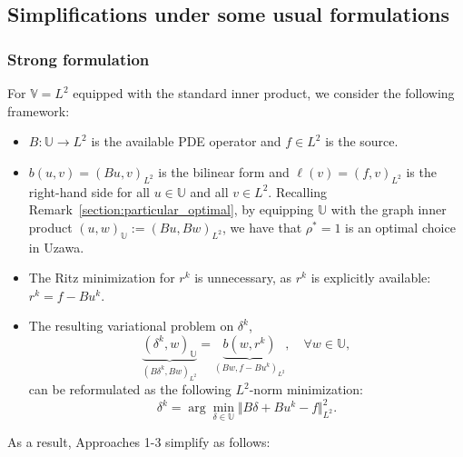 \documentclass{article}
\theoremstyle{definition}
\begin{document}
\subsection{Simplifications under some usual formulations}\label{section:Simplifications}

\subsubsection{Strong formulation}\label{section:PINNs}
For $\mathbb{V}=L^2$ equipped with the standard inner product, we consider the following framework:
\begin{itemize}
    \item $B:\mathbb{U}\longrightarrow L^2$ is the available PDE operator and $f\in L^2$ is the source.
    \item $b(u,v)=(Bu,v)_{L^2}$ is the bilinear form and $\ell(v)=(f,v)_{L^2}$ is the right-hand side for all $u\in\mathbb{U}$ and all $v\in L^2$. Recalling Remark~\ref{section:particular_optimal}, by equipping $\mathbb{U}$ with the graph inner product $(u,w)_\mathbb{U} := (Bu,Bw)_{L^2}$, we have that $\rho^*=1$ is an optimal choice in Uzawa.
    \item The Ritz minimization for $r^k$ is unnecessary, as $r^k$ is explicitly available: $r^k=f-Bu^k$.
    \item The resulting variational problem on $\delta^k$, 
    $$\underbrace{(\delta^k, w)_\mathbb{U}}_{(B\delta^k,Bw)_{L^2}} = \underbrace{b(w,r^k)}_{(Bw,f-Bu^k)_{L^2}},\quad \forall w\in\mathbb{U},$$ can be reformulated as the following $L^2$-norm minimization:
    $$ \delta^k = \arg\min_{\delta\in\mathbb{U}} \Vert B\delta + Bu^k - f\Vert_{L^2}^2.$$
\end{itemize}
As a result, Approaches 1-3 simplify as follows:
\end{document}
